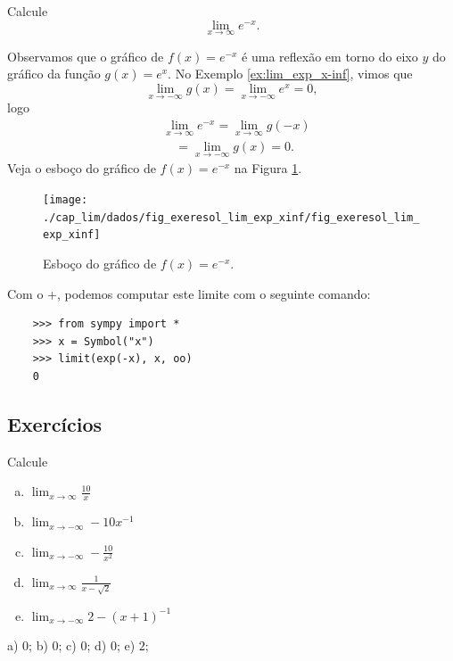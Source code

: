 \begin{exeresol}
  Calcule
  \begin{equation}
    \lim_{x\to \infty} e^{-x}.
  \end{equation}
\end{exeresol}
\begin{resol}
  Observamos que o gráfico de $f(x)=e^{-x}$ é uma reflexão em torno do eixo $y$ do gráfico da função $g(x)=e^x$. No Exemplo \ref{ex:lim_exp_x-inf}, vimos que
  \begin{equation}
    \lim_{x\to -\infty} g(x) = \lim_{x\to -\infty} e^{x} = 0,
  \end{equation}
  logo
  \begin{align}
    & \lim_{x\to \infty} e^{-x} = \lim_{x\to \infty} g(-x) \\
    & \text{}\quad = \lim_{x\to -\infty} g(x) = 0.
  \end{align}
  Veja o esboço do gráfico de $f(x)=e^{-x}$ na Figura \ref{fig:exeresol_lim_exp_xinf}.

  \begin{figure}[H]
    \centering
    \texttt{[image: ./cap\_lim/dados/fig\_exeresol\_lim\_exp\_xinf/fig\_exeresol\_lim\_exp\_xinf]}
    \caption{Esboço do gráfico de $f(x)=e^{-x}$.}
    \label{fig:exeresol_lim_exp_xinf}
  \end{figure}  

  \ifispython
  Com o {\python}+{\sympy}, podemos computar este limite com o seguinte comando:
  \begin{lstlisting}
    >>> from sympy import *
    >>> x = Symbol("x")
    >>> limit(exp(-x), x, oo)
    0
  \end{lstlisting}
  \fi
\end{resol}

\subsection{Exercícios}

\begin{exer}
  Calcule
  \begin{enumerate}[a)]
  \item $\displaystyle\lim_{x\to\infty} \frac{10}{x}$
  \item $\displaystyle\lim_{x\to -\infty} -10x^{-1}$
  \item $\displaystyle\lim_{x\to -\infty} -\frac{10}{x^2}$
  \item $\displaystyle\lim_{x\to\infty} \frac{1}{x-\sqrt{2}}$
  \item $\displaystyle\lim_{x\to -\infty} 2 - (x+1)^{-1}$
\end{enumerate}
\end{exer}
\begin{resp}
  a) $0$; b) $0$; c) $0$; d) $0$; e) $2$; 
\end{resp}

